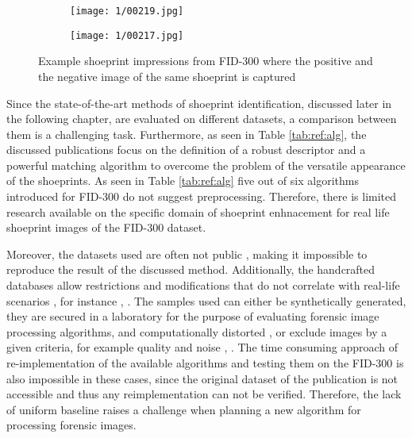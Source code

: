 \documentclass[draft,final]{vutinfth} %
\begin{document}
\begin{figure}[H]
  \centering
  \begin{subfigure}[t]{0.38\columnwidth}
    \centering
    \texttt{[image: 1/00219.jpg]}
	\caption{}
	\label{fig:int:cap:pos}
  \end{subfigure}
  \begin{subfigure}[t]{0.38\columnwidth}
    \centering
    \texttt{[image: 1/00217.jpg]}
	\caption{}
	\label{fig:int:cap:neg}
  \end{subfigure}
  \caption{Example shoeprint impressions from FID-300 where the positive  and the negative  image of the same shoeprint is captured}
  \label{fig:int:cap}
\end{figure}


\par
Since the state-of-the-art methods of shoeprint identification, discussed later in the following chapter, are evaluated on different datasets, a comparison between them is a challenging task.
Furthermore, as seen in Table \ref{tab:ref:alg}, the discussed publications focus on the definition of a robust descriptor and a powerful matching algorithm to overcome the problem of the versatile appearance of the shoeprints.
As seen in Table \ref{tab:ref:alg} five out of six algorithms introduced for FID-300 do not suggest preprocessing.
Therefore, there  is limited research available on the specific domain of shoeprint enhnacement for real life shoeprint images of the FID-300 dataset. 
\par
Moreover, the datasets used are often not public \cite{katireddy2017novel}, \cite{dardi2009texture} making it impossible to reproduce the result of the discussed method.
Additionally, the handcrafted databases allow restrictions and modifications that do not correlate with real-life scenarios \cite{rida2019forensic}, for instance \cite{dardi2009texture}, \cite{tang2010footwear}.
The samples used can either be synthetically generated, they are secured in a laboratory for the purpose of evaluating forensic image processing algorithms, and computationally distorted \cite{de2005automated}, \cite{gueham2008automatic} or exclude images by a given criteria, for example quality and noise \cite{dardi2009texture}, \cite{tang2010footwear}.
The time consuming approach of re-implementation of the available algorithms and testing them on the FID-300 is also impossible in these cases, since the original dataset of the publication is not accessible and thus any reimplementation can not be verified.
Therefore, the lack of uniform baseline raises a challenge when planning a new algorithm for processing forensic images.
\end{document}
